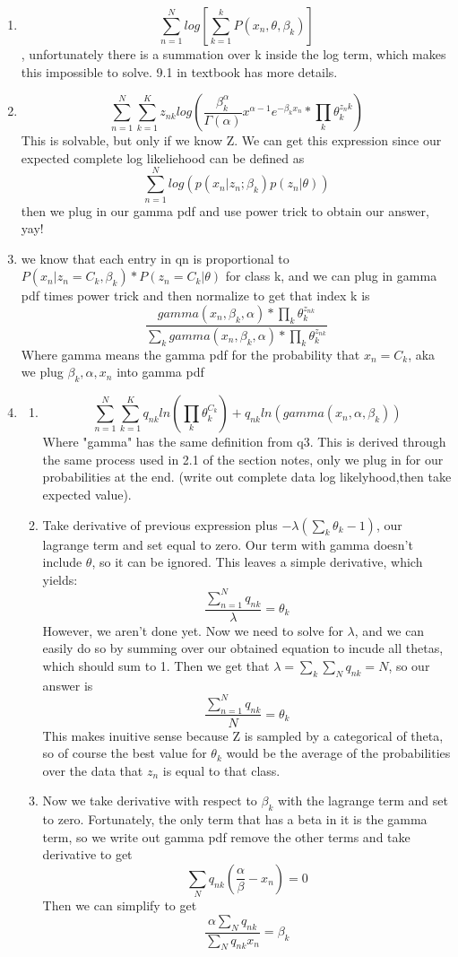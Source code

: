 \documentclass[submit]{harvardml}
\begin{document}
\begin{enumerate}
  \item $$ \sum^N_{n=1}log[\sum^k_{k=1}P(x_n,\theta,\beta_k)]$$, unfortunately there is a summation over k inside the log term, which makes this impossible to solve. 9.1 in textbook has more details. 
  \item $$\sum^N_{n=1}\sum^K_{k=1}z_{nk}log(\frac{\beta^\alpha_k}{\Gamma(\alpha)}x^{\alpha-1}e^{-\beta_kx_n} * \prod_k \theta_k^{z_nk})$$
  This is solvable, but only if we know Z. We can get this expression since our expected complete log likeliehood can be defined as $$\sum^N_{n=1}log(p(x_n|z_n;\beta_k)p(z_n|\theta))$$ then we plug in our gamma pdf and use power trick to obtain our answer, yay!
  \item we know that each entry in qn is proportional to $P(x_n|z_n=C_k,\beta_k)*P(z_n=C_k|\theta)$ for class k, and we can plug in gamma pdf times power trick and then normalize to get that index k is  $$\frac{gamma(x_n,\beta_k,\alpha) * \prod_k\theta_k^{z_{nk}}}{\sum_k gamma(x_n,\beta_k,\alpha) * \prod_k\theta_k^{z_{nk}} }$$ Where gamma means the gamma pdf for the probability that $x_n = C_k$, aka we plug $\beta_k, \alpha, x_n$ into gamma pdf  
  \item 
    \begin{enumerate}
      \item $$\sum^N_{n=1}\sum^K_{k=1}q_{nk}ln(\prod_k\theta_k^{C_k}) + q_{nk}ln(gamma(x_n,\alpha,\beta_k))$$ Where "gamma" has the same definition from q3. This is derived through the same process used in 2.1 of the section notes, only we plug in for our probabilities at the end. (write out complete data log likelyhood,then take expected value). 
      \item Take derivative of previous expression plus $-\lambda(\sum_k\theta_k-1)$, our lagrange term and set equal to zero. Our term with gamma doesn't include $\theta$, so it can be ignored. This leaves a simple derivative, which yields:
      $$\frac{\sum^N_{n=1}q_{nk}}{\lambda} = \theta_k$$
      However, we aren't done yet. Now we need to solve for $\lambda$, and we can easily do so by summing over our obtained equation to incude all thetas, which should sum to 1. Then we get that $\lambda = \sum_k\sum_Nq_{nk} = N$,
      so our answer is 
      $$\frac{\sum^N_{n=1}q_{nk}}{N} = \theta_k$$
      This makes inuitive sense because Z is sampled by a categorical of theta, so of course the best value for $\theta_k$ would be the average of the probabilities over the data that $z_n$ is equal to that class. 
      \item 
      Now we take derivative with respect to $\beta_k$ with the lagrange term and set to zero. 
      Fortunately, the only term that has a beta in it is the gamma term, so we write out gamma pdf remove the other terms and take derivative to get $$\sum_Nq_{nk}(\frac{\alpha}{\beta} - x_n) = 0$$
      Then we can simplify to get 
      $$\frac{\alpha\sum_Nq_{nk}}{\sum_Nq_{nk}x_n} = \beta_k$$
      

\end{enumerate}
\end{enumerate}
\end{document}
